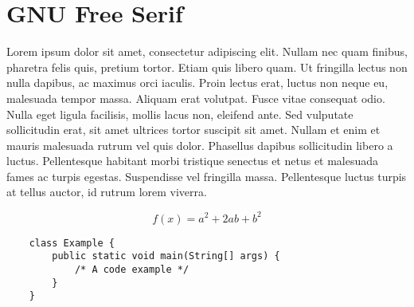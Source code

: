 \documentclass{article}
\begin{document}
\section*{GNU Free Serif}
\noindent Lorem ipsum dolor sit amet, consectetur adipiscing elit. Nullam nec
quam finibus, pharetra felis quis, pretium tortor. Etiam quis libero quam. Ut
fringilla lectus non nulla dapibus, ac maximus orci iaculis. Proin lectus erat,
luctus non neque eu, malesuada tempor massa. Aliquam erat volutpat. Fusce vitae
consequat odio. Nulla eget ligula facilisis, mollis lacus non, eleifend ante.
Sed vulputate sollicitudin erat, sit amet ultrices tortor suscipit sit amet.
Nullam et enim et mauris malesuada rutrum vel quis dolor. Phasellus dapibus
sollicitudin libero a luctus. Pellentesque habitant morbi tristique senectus et
netus et malesuada fames ac turpis egestas. Suspendisse vel fringilla massa.
Pellentesque luctus turpis at tellus auctor, id rutrum lorem viverra.

\bigskip

\begin{equation}
    f(x) = a^2 + 2ab + b^2 
\end{equation}

\bigskip

\begin{verbatim}
    class Example {
        public static void main(String[] args) {
            /* A code example */
        }
    }
\end{verbatim}
\end{document}
